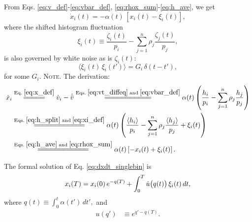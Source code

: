 \documentclass[reprint, superscriptaddress, floatfix]{revtex4-1}
\newcommand{\note}[1]{{\color{DarkGreen}\footnotesize \textsc{Note.} #1}}
\begin{document}
From Eqs.
\eqref{eq:v_def}-\eqref{eq:vbar_def},
\eqref{eq:rhox_sum}-\eqref{eq:h_ave},
we get %
%
\begin{equation}
  \dot x_i(t)
  =
  -\alpha(t) \, \left[ x_i(t) - \xi_i(t) \right]
  ,
\label{eq:dxdt_singlebin}
\end{equation}
%
where the shifted histogram fluctuation
%
\begin{equation}
  \xi_i(t)
  \equiv
  \frac{ \zeta_i(t) }
       { p_i }
  -
  \sum_{ j = 1 }^n
    \rho_j
    \frac{ \zeta_j(t) }
         {     p_j    }
  ,
\label{eq:xi_def}
\end{equation}
%
is also governed by white noise as is $\zeta_i(t)$:
\begin{equation}
  \langle \xi_i(t) \, \xi_i(t') \rangle
  = G_i \, \delta(t - t')
  ,
  \label{eq:G_def}
\end{equation}
for some $G_i$.
%
\note{The derivation:
$$
\begin{aligned}
  \dot x_i
  &\stackrel{\mathrm{Eq.\; \eqref{eq:x_def}}}
            {=\joinrel=\joinrel=\joinrel=\joinrel=}
  \dot v_i - \dot{ \bar v }
  \stackrel{\mathrm{Eqs.\; \eqref{eq:vt_diffeq}\; and\; \eqref{eq:vbar_def}}}
            {=\joinrel=\joinrel=\joinrel=\joinrel=\joinrel=\joinrel=\joinrel=\joinrel=\joinrel=\joinrel=}
  \alpha(t) \left(
    \frac{ h_i } { p_i }
    -
    \sum_{ j = 1 }^n
      \rho_j \frac{ h_j } { p_j }
  \right)
  \\
  &\stackrel{\mathrm{Eqs.\; \eqref{eq:h_split} \; and \; \eqref{eq:xi_def}}}
            {=\joinrel=\joinrel=\joinrel=\joinrel=\joinrel=\joinrel=\joinrel=\joinrel=\joinrel=\joinrel=\joinrel=}
  \alpha(t) \left(
    \frac{ \langle h_i \rangle } { p_i }
    -
    \sum_{ j = 1 }^n
      \rho_j \frac{ \langle h_j \rangle } { p_j }
    +
    \xi_i(t)
  \right)
  \\
  &\stackrel{\mathrm{Eqs.\; \eqref{eq:h_ave} \;and\; \eqref{eq:rhox_sum}}}
            {=\joinrel=\joinrel=\joinrel=\joinrel=\joinrel=\joinrel=\joinrel=\joinrel=\joinrel=\joinrel=\joinrel=}
  \alpha(t) \left[ -x_i(t) + \xi_i(t) \right].
\end{aligned}
$$
}

The formal solution of Eq. \eqref{eq:dxdt_singlebin} is
%
\begin{equation}
x_i(T)
=
x_i(0) \, e^{-q(T)}
+
\int_0^T
  \dot u\bigl( q(t) \bigr) \, \xi_i(t) \, dt,
\notag
\end{equation}
%
where
%
$
q(t) \equiv \int_0^t \alpha(t') \, dt',
$
%
and
%
\begin{align}
u(q')
&\equiv
e^{q' - q(T)}.
\label{eq:u_def}
\end{align}
\end{document}
